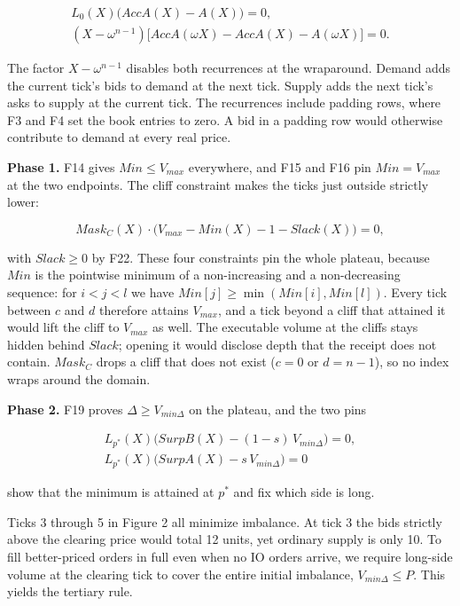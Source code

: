 \begin{equation}
\begin{gathered}
L_{0}(X)\bigl(AccA(X) - A(X)\bigr) = 0, \\
(X - \omega^{n-1})\bigl[AccA(\omega X) - AccA(X) - A(\omega X)\bigr] = 0.
\end{gathered}
\tag{F6, F8}
\end{equation}

The factor \(X-\omega^{n-1}\) disables both recurrences at the wraparound. Demand adds the current tick's bids to demand at the next tick. Supply adds the next tick's asks to supply at the current tick. The recurrences include padding rows, where F3 and F4 set the book entries to zero. A bid in a padding row would otherwise contribute to demand at every real price.

\textbf{Phase 1.} F14 gives \(Min \le V_{max}\) everywhere, and F15 and F16 pin \(Min = V_{max}\) at the two endpoints. The cliff constraint makes the ticks just outside strictly lower:

\[Mask_C(X) \cdot \big(V_{max} - Min(X) - 1 - Slack(X)\big) = 0, \tag{F17}\]

with \(Slack \ge 0\) by F22. These four constraints pin the whole plateau, because \(Min\) is the pointwise minimum of a non-increasing and a non-decreasing sequence: for \(i < j < l\) we have \(Min[j] \ge \min(Min[i], Min[l])\). Every tick between \(c\) and \(d\) therefore attains \(V_{max}\), and a tick beyond a cliff that attained it would lift the cliff to \(V_{max}\) as well. The executable volume at the cliffs stays hidden behind \(Slack\); opening it would disclose depth that the receipt does not contain. \(Mask_C\) drops a cliff that does not exist (\(c = 0\) or \(d = n-1\)), so no index wraps around the domain.

\textbf{Phase 2.} F19 proves \(\Delta \ge V_{min\Delta}\) on the plateau, and the two pins

\begin{equation}
\begin{gathered}
L_{p^*}(X)\bigl(SurpB(X) - (1-s)\,V_{min\Delta}\bigr) = 0, \\
L_{p^*}(X)\bigl(SurpA(X) - s\,V_{min\Delta}\bigr) = 0
\end{gathered}
\tag{F20}
\end{equation}

show that the minimum is attained at \(p^*\) and fix which side is long.

Ticks 3 through 5 in Figure 2 all minimize imbalance. At tick 3 the bids strictly above the clearing price would total 12 units, yet ordinary supply is only 10. To fill better-priced orders in full even when no IO orders arrive, we require long-side volume at the clearing tick to cover the entire initial imbalance, \(V_{min\Delta}\le P\). This yields the tertiary rule.

